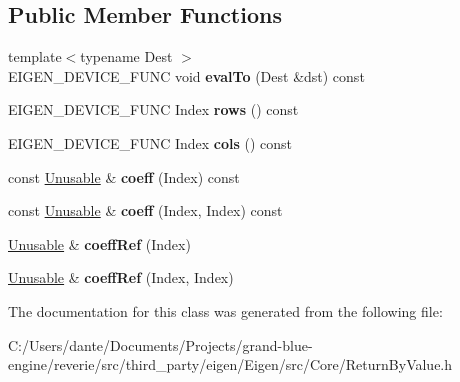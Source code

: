 \subsection*{Public Member Functions}
\begin{DoxyCompactItemize}
\item 
\mbox{\label{class_eigen_1_1_return_by_value_aeeb8c9df6d5dcf039f2b622a954e9bf7}} 
{\footnotesize template$<$typename Dest $>$ }\\E\+I\+G\+E\+N\+\_\+\+D\+E\+V\+I\+C\+E\+\_\+\+F\+U\+NC void {\bfseries eval\+To} (Dest \&dst) const
\item 
\mbox{\label{class_eigen_1_1_return_by_value_af3453eb4775c3b108d7dc1f2766bbee4}} 
E\+I\+G\+E\+N\+\_\+\+D\+E\+V\+I\+C\+E\+\_\+\+F\+U\+NC Index {\bfseries rows} () const
\item 
\mbox{\label{class_eigen_1_1_return_by_value_a3c92266c99fd9f9b6b24a8ca64936056}} 
E\+I\+G\+E\+N\+\_\+\+D\+E\+V\+I\+C\+E\+\_\+\+F\+U\+NC Index {\bfseries cols} () const
\item 
\mbox{\label{class_eigen_1_1_return_by_value_a89c8cb89fa3bd7c48e56b8a67a3dcaef}} 
const \mbox{\hyperlink{class_eigen_1_1_return_by_value_1_1_unusable}{Unusable}} \& {\bfseries coeff} (Index) const
\item 
\mbox{\label{class_eigen_1_1_return_by_value_a05cdb7880ad434c1e9ff09e0e5e5eebf}} 
const \mbox{\hyperlink{class_eigen_1_1_return_by_value_1_1_unusable}{Unusable}} \& {\bfseries coeff} (Index, Index) const
\item 
\mbox{\label{class_eigen_1_1_return_by_value_a84d87899d20ba8c7e6ec89cb832b2f4f}} 
\mbox{\hyperlink{class_eigen_1_1_return_by_value_1_1_unusable}{Unusable}} \& {\bfseries coeff\+Ref} (Index)
\item 
\mbox{\label{class_eigen_1_1_return_by_value_a32679e6285c6b9a168e7af111eb53896}} 
\mbox{\hyperlink{class_eigen_1_1_return_by_value_1_1_unusable}{Unusable}} \& {\bfseries coeff\+Ref} (Index, Index)
\end{DoxyCompactItemize}


The documentation for this class was generated from the following file\+:\begin{DoxyCompactItemize}
\item 
C\+:/\+Users/dante/\+Documents/\+Projects/grand-\/blue-\/engine/reverie/src/third\+\_\+party/eigen/\+Eigen/src/\+Core/Return\+By\+Value.\+h\end{DoxyCompactItemize}

